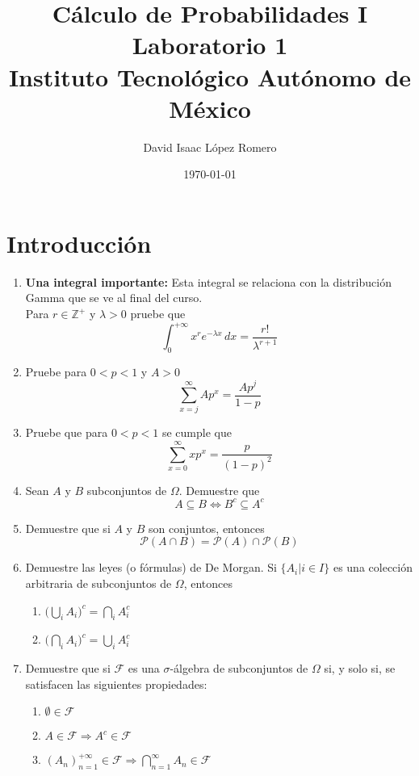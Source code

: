 \documentclass[10pt,a4paper]{article}
\title{Cálculo de Probabilidades I \\
	\large Laboratorio 1\\ Instituto Tecnológico Autónomo de México}
\author{David Isaac López Romero}
\date{\today}
\begin{document}
\maketitle

\section{Introducción}

\begin{enumerate}
	\item \textbf{Una integral importante:} Esta integral se relaciona con la distribución Gamma que se ve al final del curso.\\
	Para $r \in \mathbb{Z}^{+}$ y $\lambda>0$ pruebe que
	\[
	\int_{0}^{+\infty} x^{r} e^{-\lambda x} \,dx = \dfrac{r!}{\lambda^{r+1}}
	\]
	
	\item Pruebe para $0<p<1$ y $A>0$ 
	\[
	\sum_{x=j}^{\infty} Ap^x = \dfrac{A p^j}{1-p}
	\]
	
	\item Pruebe que para $0<p<1$ se cumple que
	\[
	\sum_{x=0}^{\infty} xp^x= \dfrac{p}{(1-p)^2}
	\]
	
	\item Sean $A$ y $B$ subconjuntos de $\Omega$. Demuestre que
	\[
	A \subseteq B \Longleftrightarrow B^c \subseteq A^c
	\]
	
	\item Demuestre que si $A$ y $B$ son conjuntos, entonces
	\[
	\mathcal{P}(A \cap B) = \mathcal{P}(A) \cap \mathcal{P}(B)
	\]
	
	
	\item Demuestre las leyes (o fórmulas) de De Morgan. Si $\{ A_i | i \in I\}$ es una colección arbitraria de subconjuntos de $\Omega$, entonces
	\begin{enumerate}
		\item $\Big( \bigcup_{i} A_i \Big)^c = \bigcap_{i} A_i^c$
		\item $\Big( \bigcap_{i} A_i \Big)^c = \bigcup_{i} A_i^c$
	\end{enumerate}


	\item Demuestre que si $\mathcal{F}$ es una $\sigma$-álgebra de subconjuntos de $\Omega$ si, y solo si, se satisfacen las siguientes propiedades:
	\begin{enumerate}
		\item $\emptyset \in \mathcal{F}$ 
		\item $A \in \mathcal{F} \Longrightarrow A^{c} \in \mathcal{F}$
		\item $(A_n)_{n=1}^{+\infty} \in \mathcal{F} \Longrightarrow \bigcap\limits_{n=1}^{\infty} A_n \in \mathcal{F}$
	\end{enumerate}
	

\end{enumerate}
\end{document}
